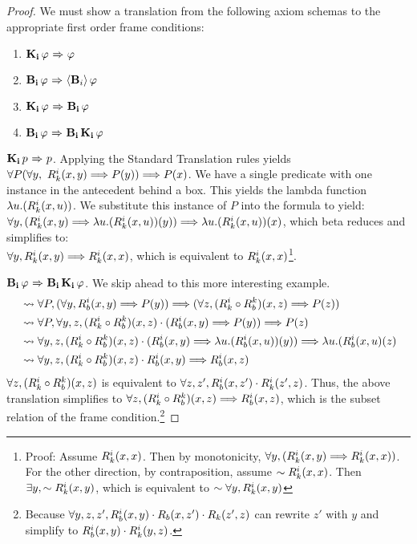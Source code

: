 \begin{proof} We must show a translation from the following axiom schemas to the appropriate first order frame conditions:
	\begin{enumerate}
		\item $\mathbf{K}_{\mathbf{i}}\,\varphi {\ \Rightarrow \ } \varphi$
		\item $\mathbf{B}_{\mathbf{i}}\,\varphi {\ \Rightarrow \ } \langle \mathbf{B}_{i} \rangle\,\varphi$
		\item $\mathbf{K}_{\mathbf{i}}\,\varphi {\ \Rightarrow \ } \mathbf{B}_{\mathbf{i}}\,\varphi$
		\item $\mathbf{B}_{\mathbf{i}}\,\varphi {\ \Rightarrow \ } \mathbf{B}_{\mathbf{i}}\,\mathbf{K}_{\mathbf{i}}\,\varphi$
	\end{enumerate}

	$\mathbf{K}_{\mathbf{i}}\,p {\ \Rightarrow \ } p$. Applying the Standard Translation rules yields $\forall P(\forall y,\ R_{k}^i(x,y) \Longrightarrow P(y)) \Longrightarrow P(x)$. We have a single predicate with one instance in the antecedent behind a box. This yields the lambda function $\lambda u.(R_{k}^i(x,u))$. We substitute this instance of $P$ into the formula to yield:\\
	$\forall y, (R_{k}^i(x,y)\Longrightarrow \lambda u.(R_{k}^i(x,u))(y))\Longrightarrow \lambda u.(R_{k}^i(x,u))(x)$, which beta reduces and simplifies to:\\
	$\forall y, R_{k}^i(x,y)\Longrightarrow R_{k}^i(x,x)$, which is equivalent to $R_{k}^i(x,x)$\footnote{Proof: Assume $R_{k}^i(x,x)$. Then by monotonicity, $\forall y,(R_{k}^i(x,y) \Longrightarrow R_{k}^i(x,x))$. For the other direction, by contraposition, assume $\sim R_{k}^i(x,x)$. Then $\exists y, \sim R_{k}^i(x,y)$, which is equivalent to $\sim \forall y, R_{k}^i(x, y)$}.
	
	$\mathbf{B}_{\mathbf{i}}\,\varphi {\ \Rightarrow \ } \mathbf{B}_{\mathbf{i}}\,\mathbf{K}_{\mathbf{i}}\,\varphi$. We skip ahead to this more interesting example.
	\begin{align*}
		&\rightsquigarrow \forall P,(\forall y,R_{b}^i(x,y)\Longrightarrow P(y)) \Longrightarrow (\forall z, (R_{k}^i \circ R_{b}^k )(x,z) \Longrightarrow P(z)) \\
		&\rightsquigarrow \forall P,\forall y,z, (R_{k}^i \circ R_{b}^k )(x,z)\cdot(R_{b}^i(x,y)\Longrightarrow P(y)) \Longrightarrow P(z)\\
		&\rightsquigarrow \forall y,z, (R_{k}^i \circ R_{b}^k )(x,z)\cdot(R_{b}^i(x,y)\Longrightarrow \lambda u. (R_{b}^i(x,u))(y)) \Longrightarrow \lambda u.(R_{b}^i(x,u)(z)\\
		&\rightsquigarrow \forall y,z, (R_{k}^i \circ R_{b}^k )(x,z)\cdot R_{b}^i(x,y)\Longrightarrow R_{b}^i(x,z)
	\end{align*}	
	$\forall z,(R_{k}^i \circ R_{b}^k )(x,z)$ is equivalent to $\forall z,z', R_{b}^i(x,z') \cdot R_{k}^i(z',z)$. 
	Thus, the above translation simplifies to
	$\forall z, (R_{k}^i \circ R_{b}^k )(x,z) \Longrightarrow R_{b}^i(x,z)$, which is the subset relation of the frame condition.\footnote{Because $\forall y,z,z', R_{b}^i(x,y)\cdot R_{b}(x,z')\cdot R_{k}(z',z)$ can rewrite $z'$ with $y$ and simplify to $R_{b}^i(x,y)\cdot R_{k}^i(y,z)$.}
	

\end{proof}
